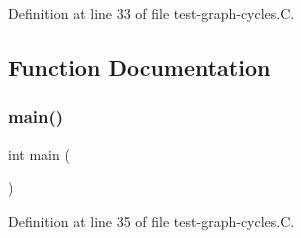 Definition at line 33 of file test-\/graph-\/cycles.\+C.



\subsection{Function Documentation}
\mbox{\label{test-graph-cycles_8_c_ae66f6b31b5ad750f1fe042a706a4e3d4}} 
\subsubsection{\texorpdfstring{main()}{main()}}
{\footnotesize\ttfamily int main (\begin{DoxyParamCaption}{ }\end{DoxyParamCaption})}



Definition at line 35 of file test-\/graph-\/cycles.\+C.


